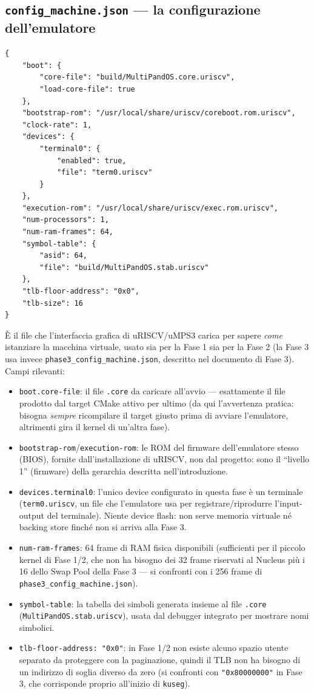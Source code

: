 \documentclass[11pt,a4paper]{article}
\newcommand{\code}[1]{\texttt{#1}}
\begin{document}
\subsection{\code{config\_machine.json} --- la configurazione dell'emulatore}
\begin{lstlisting}
{
    "boot": {
        "core-file": "build/MultiPandOS.core.uriscv",
        "load-core-file": true
    },
    "bootstrap-rom": "/usr/local/share/uriscv/coreboot.rom.uriscv",
    "clock-rate": 1,
    "devices": {
        "terminal0": {
            "enabled": true,
            "file": "term0.uriscv"
        }
    },
    "execution-rom": "/usr/local/share/uriscv/exec.rom.uriscv",
    "num-processors": 1,
    "num-ram-frames": 64,
    "symbol-table": {
        "asid": 64,
        "file": "build/MultiPandOS.stab.uriscv"
    },
    "tlb-floor-address": "0x0",
    "tlb-size": 16
}
\end{lstlisting}
\`E il file che l'interfaccia grafica di uRISCV/uMPS3 carica per sapere
\emph{come} istanziare la macchina virtuale, usato sia per la Fase 1 sia
per la Fase 2 (la Fase 3 usa invece \code{phase3\_config\_machine.json},
descritto nel documento di Fase 3). Campi rilevanti:
\begin{itemize}
\item \code{boot.core-file}: il file \code{.core} da caricare all'avvio
  --- esattamente il file prodotto dal target CMake attivo per ultimo
  (da qui l'avvertenza pratica: bisogna \emph{sempre} ricompilare il target
  giusto prima di avviare l'emulatore, altrimenti gira il kernel di
  un'altra fase).
\item \code{bootstrap-rom}/\code{execution-rom}: le ROM del firmware
  dell'emulatore stesso (BIOS), fornite dall'installazione di uRISCV, non
  dal progetto: sono il ``livello 1'' (firmware) della gerarchia descritta
  nell'introduzione.
\item \code{devices.terminal0}: l'unico device configurato in questa fase
  è un terminale (\code{term0.uriscv}, un file che l'emulatore usa per
  registrare/riprodurre l'input-output del terminale). Niente device flash:
  non serve memoria virtuale né backing store finché non si arriva alla
  Fase 3.
\item \code{num-ram-frames}: 64 frame di RAM fisica disponibili (sufficienti
  per il piccolo kernel di Fase 1/2, che non ha bisogno dei 32 frame
  riservati al Nucleus più i 16 dello Swap Pool della Fase 3 --- si
  confronti con i 256 frame di \code{phase3\_config\_machine.json}).
\item \code{symbol-table}: la tabella dei simboli generata insieme al file
  \code{.core} (\code{MultiPandOS.stab.uriscv}), usata dal debugger
  integrato per mostrare nomi simbolici.
\item \code{tlb-floor-address: "0x0"}: in Fase 1/2 non esiste alcuno spazio
  utente separato da proteggere con la paginazione, quindi il TLB non ha
  bisogno di un indirizzo di soglia diverso da zero (si confronti con
  \code{"0x80000000"} in Fase 3, che corrisponde proprio all'inizio di
  \code{kuseg}).
\end{itemize}
\end{document}
